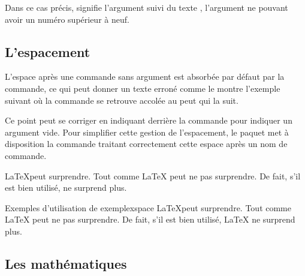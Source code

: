 
Dans ce cas précis,  signifie \og l'argument  suivi du texte  \fg, l'argument ne pouvant avoir un numéro supérieur à neuf.

\subsection{L'espacement}

L'espace après une commande sans argument est absorbée par défaut par la commande, ce qui peut donner un texte erroné comme le montre l'exemple suivant où la commande  se retrouve accolée au \og peut \fg qui la suit.

Ce point peut se corriger en indiquant derrière la commande \macron{\{\}} pour indiquer un argument vide. Pour simplifier cette gestion de l'espacement, le paquet  met à disposition la commande  traitant correctement cette espace après un nom de commande. 

\begin{codedoublevrai}
\LaTeX peut surprendre. Tout comme \LaTeX{} peut ne pas surprendre. De fait, s'il est 
bien utilisé, \MonLaTeX ne surprend plus.
\end{codedoublevrai}

\begin{codedoublefaux}{Exemples d'utilisation de }{exemplexspace}
\newcommand{\MonLaTeX}{\LaTeX\xspace}
\LaTeX peut surprendre. Tout comme \LaTeX{} peut ne pas surprendre. De fait, s'il est 
bien utilisé, \MonLaTeX ne surprend plus.
\end{codedoublefaux}


\subsection{Les mathématiques}

